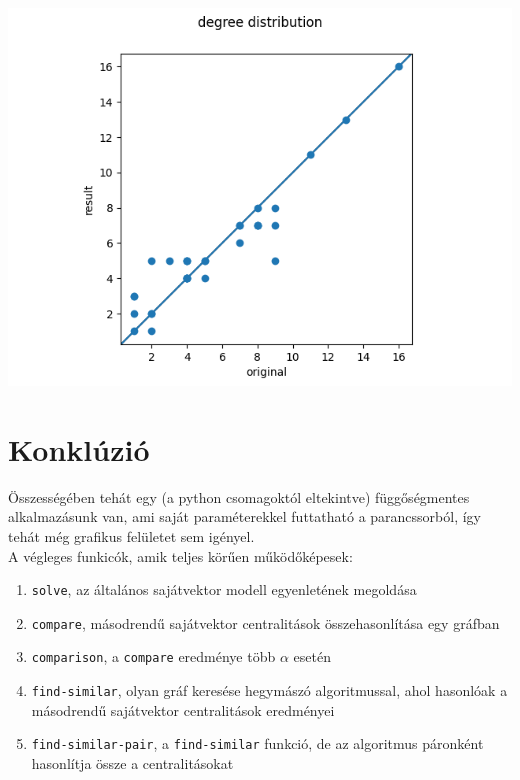 \documentclass[12pt,numbers=noenddot]{report}
\begin{document}
\hspace{0.5cm}

\includegraphics[width=0.8\linewidth]{images/find_similar_scatterplot2.png}





\chapter{Konklúzió}

Összességében tehát egy (a python csomagoktól eltekintve) függőségmentes 
alkalmazásunk van, ami saját paraméterekkel futtatható a parancssorból, 
így tehát még grafikus felületet sem igényel.\\


\noindent
A végleges funkicók, amik teljes körűen működőképesek:
\begin{enumerate}
	\item \texttt{solve}, az általános sajátvektor modell egyenletének megoldása
	\item \texttt{compare}, másodrendű sajátvektor centralitások összehasonlítása egy gráfban
	\item \texttt{comparison}, a \texttt{compare} eredménye több $\alpha$ esetén
	\item \texttt{find-similar}, olyan gráf keresése hegymászó algoritmussal, ahol hasonlóak a másodrendű sajátvektor centralitások eredményei
	\item \texttt{find-similar-pair}, a \texttt{find-similar} funkció, de az algoritmus páronként hasonlítja össze a centralitásokat
\end{enumerate}
\end{document}
